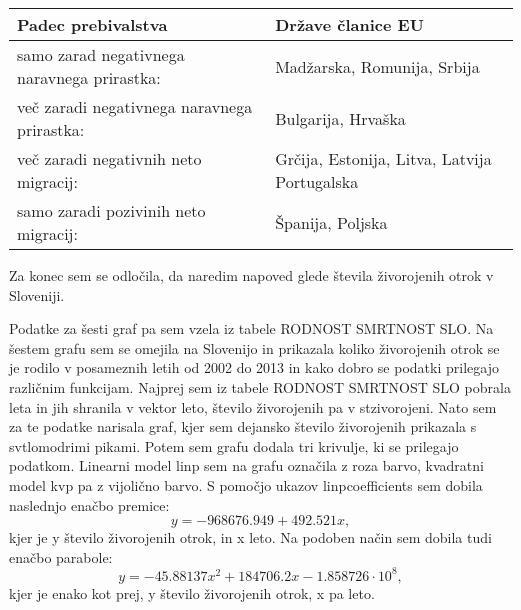 \documentclass[11pt,a4paper]{article}
\begin{document}
\newpage
\begin{table} [h]

\begin{tabular}{|l| l| }

\hline

\textbf{Padec prebivalstva}&\textbf{Države članice EU} \\


\hline


\multicolumn{1}{|l|}{samo zarad negativnega naravnega prirastka:}&\multicolumn{1}{|p{8cm}|}{ Madžarska, Romunija, Srbija} \\


\hline


\multicolumn{1}{|l|}{več zaradi negativnega naravnega prirastka:}&\multicolumn{1}{|p{8cm}|}{Bulgarija, Hrvaška}\\


\hline


\multicolumn{1}{|l|}{več zaradi negativnih neto migracij:}&\multicolumn{1}{|p{8cm}|}{Grčija, Estonija, Litva, Latvija Portugalska}\\


\hline


\multicolumn{1}{|l|}{samo zaradi pozivinih neto migracij:}&\multicolumn{1}{|l|}{Španija, Poljska}\\


\hline



\end{tabular}


\end{table}



Za konec sem se odločila, da naredim napoved glede števila živorojenih otrok v Sloveniji.

Podatke za šesti graf pa sem vzela iz tabele RODNOST SMRTNOST SLO.
Na šestem grafu sem se omejila na Slovenijo in prikazala koliko živorojenih otrok se je rodilo v posameznih letih od 2002 do 2013 in kako dobro se podatki prilegajo različnim funkcijam.
Najprej sem iz tabele RODNOST SMRTNOST SLO pobrala leta in jih shranila v vektor leto, število živorojenih pa v stzivorojeni. Nato sem za te podatke narisala graf, kjer sem dejansko število živorojenih prikazala s svtlomodrimi pikami.
Potem sem grafu dodala tri krivulje, ki se prilegajo podatkom.
Linearni model linp sem na grafu označila z roza barvo, kvadratni model kvp pa z vijolično barvo. S pomočjo ukazov linpcoefficients sem dobila naslednjo enačbo premice: $$y= -968676.949 + 492.521x,$$ kjer je y število živorojenih otrok, in x leto.
Na podoben način sem dobila tudi enačbo parabole: $$ y = -45.88137 x^2 + 184706.2 x - 1.858726 \cdot 10^8 , $$ kjer je enako kot prej, y število živorojenih otrok, x pa leto.
\end{document}
